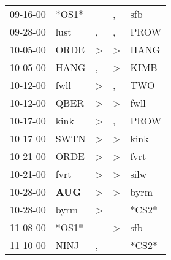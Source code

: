 \begin{supertabular}{p{0.07\textwidth}p{0.06\textwidth}p{0.02\textwidth}p{0.02\textwidth}p{0.06\textwidth}}
          09-16-00\textsuperscript{} &                            *OS1* &                  &                , &            sfb\textsuperscript{} \\
          09-28-00\textsuperscript{} &           lust\textsuperscript{} &                , &                , &           PROW\textsuperscript{} \\
          10-05-00\textsuperscript{} &           ORDE\textsuperscript{} &     \textgreater &     \textgreater &           HANG\textsuperscript{} \\
          10-05-00\textsuperscript{} &           HANG\textsuperscript{} &                , &     \textgreater &           KIMB\textsuperscript{} \\
          10-12-00\textsuperscript{} &           fwll\textsuperscript{} &     \textgreater &                , &            TWO\textsuperscript{} \\
          10-12-00\textsuperscript{} &           QBER\textsuperscript{} &     \textgreater &     \textgreater &           fwll\textsuperscript{} \\
          10-17-00\textsuperscript{} &           kink\textsuperscript{} &     \textgreater &                , &           PROW\textsuperscript{} \\
          10-17-00\textsuperscript{} &           SWTN\textsuperscript{} &     \textgreater &     \textgreater &           kink\textsuperscript{} \\
          10-21-00\textsuperscript{} &           ORDE\textsuperscript{} &     \textgreater &     \textgreater &           fvrt\textsuperscript{} \\
          10-21-00\textsuperscript{} &           fvrt\textsuperscript{} &     \textgreater &     \textgreater &           silw\textsuperscript{} \\
          10-28-00\textsuperscript{} &   \textbf{AUG\textsuperscript{}} &     \textgreater &     \textgreater &           byrm\textsuperscript{} \\
          10-28-00\textsuperscript{} &           byrm\textsuperscript{} &     \textgreater &                  &                            *CS2* \\
          11-08-00\textsuperscript{} &                            *OS1* &                  &     \textgreater &            sfb\textsuperscript{} \\
          11-10-00\textsuperscript{} &           NINJ\textsuperscript{} &                , &                  &                            *CS2* \\

\end{supertabular}
